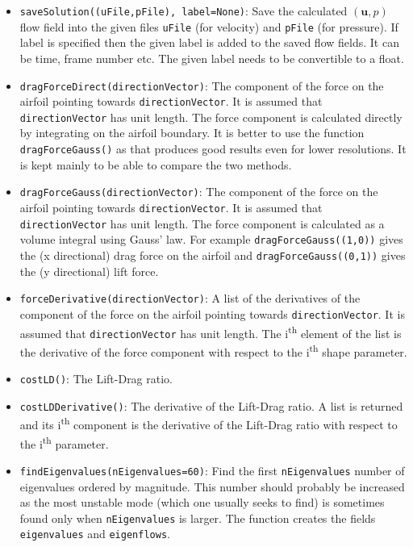 \documentclass[12pt, a4paper]{article}
\begin{document}
        \begin{itemize}
            \item \texttt{saveSolution((uFile,pFile), label=None)}: Save the calculated $(\mathbf{u}, p)$ flow field into the given files \texttt{uFile} (for velocity) and \texttt{pFile} (for pressure). If label is specified then the given label is added to the saved flow fields. It can be time, frame number etc. The given label needs to be convertible to a float.
            \item \texttt{dragForceDirect(directionVector)}: The component of the force on the airfoil pointing towards \texttt{directionVector}. It is assumed that \texttt{directionVector} has unit length. The force component is calculated directly by integrating on the airfoil boundary. It is better to use the function \texttt{dragForceGauss()} as that produces good results even for lower resolutions. It is kept mainly to be able to compare the two methods.
            \item \texttt{dragForceGauss(directionVector)}: The component of the force on the airfoil pointing towards \texttt{directionVector}. It is assumed that \texttt{directionVector} has unit length. The force component is calculated as a volume integral using Gauss' law. For example \texttt{dragForceGauss((1,0))} gives the (x directional) drag force on the airfoil and \texttt{dragForceGauss((0,1))} gives the (y directional) lift force.
            \item \texttt{forceDerivative(directionVector)}: A list of the derivatives of the component of the force on the airfoil pointing towards \texttt{directionVector}. It is assumed that \texttt{directionVector} has unit length. The i\textsuperscript{th} element of the list is the derivative of the force component with respect to the i\textsuperscript{th} shape parameter.
            \item \texttt{costLD()}: The Lift-Drag ratio.
            \item \texttt{costLDDerivative()}: The derivative of the Lift-Drag ratio. A list is returned and its i\textsuperscript{th} component is the derivative of the Lift-Drag ratio with respect to the i\textsuperscript{th} parameter.
            \item \texttt{findEigenvalues(nEigenvalues=60)}: Find the first \texttt{nEigenvalues} number of eigenvalues ordered by magnitude. This number should probably be increased as the most unstable mode (which one usually seeks to find) is sometimes found only when \texttt{nEigenvalues} is larger. The function creates the fields \texttt{eigenvalues} and \texttt{eigenflows}.

\end{itemize}
\end{document}
